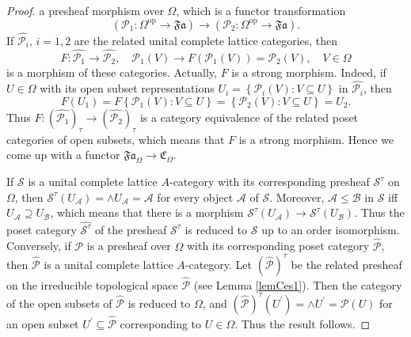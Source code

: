 \documentclass[10pt,a4paper]{amsart}
\begin{document}
\begin{proof}
a presheaf morphism over $\Omega$, which is a functor transformation
\[
\left(  \mathcal{P}_{1}:\Omega^{\operatorname{op}}\rightarrow\mathfrak{Fa}%
\right)  \rightarrow\left(  \mathcal{P}_{2}:\Omega^{\operatorname{op}%
}\rightarrow\mathfrak{Fa}\right)  .
\]
If $\widehat{\mathcal{P}_{i}}$, $i=1,2$ are the related unital complete
lattice categories, then%
\[
F:\widehat{\mathcal{P}_{1}}\rightarrow\widehat{\mathcal{P}_{2}},\quad
\mathcal{P}_{1}\left(  V\right)  \rightarrow F\left(  \mathcal{P}_{1}\left(
V\right)  \right)  =\mathcal{P}_{2}\left(  V\right)  ,\quad V\in\Omega
\]
is a morphism of these categories. Actually, $F$ is a strong morphism. Indeed,
if $U\in\Omega$ with its open subset representations $U_{i}=\left\{
\mathcal{P}_{i}\left(  V\right)  :V\subseteq U\right\}  $ in
$\widehat{\mathcal{P}_{i}}$, then
\[
F\left(  U_{1}\right)  =F\left\{  \mathcal{P}_{1}\left(  V\right)  :V\subseteq
U\right\}  =\left\{  \mathcal{P}_{2}\left(  V\right)  :V\subseteq U\right\}
=U_{2}.
\]
Thus $F:\left(  \widehat{\mathcal{P}_{1}}\right)  _{\tau}\rightarrow\left(
\widehat{\mathcal{P}_{2}}\right)  _{\tau}$ is a category equivalence of the
related poset categories of open subsets, which means that $F$ is a strong
morphism. Hence we come up with a functor $\mathfrak{Fa}_{\Omega}%
\rightarrow\mathfrak{C}_{\Omega}$.

If $\mathcal{S}$ is a unital complete lattice $A$-category with its
corresponding presheaf $\mathcal{S}^{\tau}$ on $\Omega$, then $\mathcal{S}%
^{\tau}\left(  U_{\mathcal{A}}\right)  =\wedge U_{\mathcal{A}}=\mathcal{A}$
for every object $\mathcal{A}$ of $\mathcal{S}$. Moreover, $\mathcal{A\leq B}$
in $\mathcal{S}$ iff $U_{\mathcal{A}}\supseteq U_{\mathcal{B}}$, which means
that there is a morphism $\mathcal{S}^{\tau}\left(  U_{\mathcal{A}}\right)
\rightarrow\mathcal{S}^{\tau}\left(  U_{\mathcal{B}}\right)  $. Thus the poset
category $\widehat{\mathcal{S}^{\tau}}$ of the presheaf $\mathcal{S}^{\tau}$
is reduced to $\mathcal{S}$ up to an order isomorphism. Conversely, if
$\mathcal{P}$ is a presheaf over $\Omega$ with its corresponding poset
category $\widehat{\mathcal{P}}$, then $\widehat{\mathcal{P}}$ is a unital
complete lattice $A$-category. Let $\left(  \widehat{\mathcal{P}}\right)
^{\tau}$ be the related presheaf on the irreducible topological space
$\widehat{\mathcal{P}}$ (see Lemma \ref{lemCes1}). Then the category of the
open subsets of $\widehat{\mathcal{P}}$ is reduced to $\Omega$, and $\left(
\widehat{\mathcal{P}}\right)  ^{\tau}\left(  U^{\prime}\right)  =\wedge
U^{\prime}=\mathcal{P}\left(  U\right)  $ for an open subset $U^{\prime
}\subseteq\widehat{\mathcal{P}}$ corresponding to $U\in\Omega$. Thus the
result follows.
\end{proof}
\end{document}
